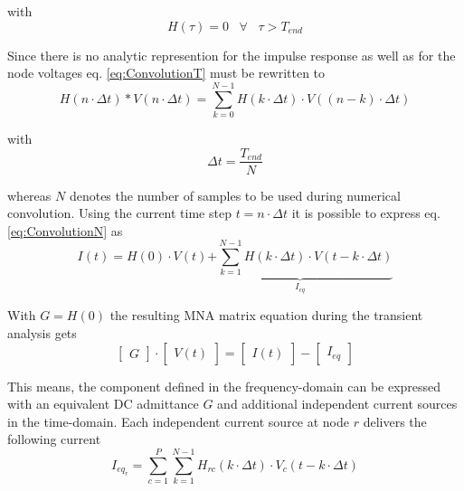 with
\begin{equation}
H\left(\tau\right) = 0 \;\;\; \forall \;\;\; \tau > T_{end}
\end{equation}

Since there is no analytic represention for the impulse response as
well as for the node voltages eq. \eqref{eq:ConvolutionT} must be
rewritten to
\begin{equation}
\label{eq:ConvolutionN}
H\left(n\cdot\Delta t\right)
*
V\left(n\cdot\Delta t\right)
=
\sum^{N-1}_{k=0} H\left(k\cdot\Delta t\right)\cdot V\left(\left(n-k\right)\cdot\Delta t\right)
\end{equation}

with
\begin{equation}
\Delta t = \dfrac{T_{end}}{N}
\end{equation}

whereas $N$ denotes the number of samples to be used during numerical
convolution.  Using the current time step $t = n\cdot\Delta t$ it is
possible to express eq. \eqref{eq:ConvolutionN} as
\begin{equation}
I\left(t\right) =
H\left(0\right)\cdot V\left(t\right) \underbrace{+
\sum^{N-1}_{k=1} H\left(k\cdot\Delta t\right)\cdot V\left(t -k\cdot\Delta t\right)}_{I_{eq}}
\end{equation}

With $G = H\left(0\right)$ the resulting MNA matrix equation during
the transient analysis gets
\begin{equation}
\begin{bmatrix}
G
\end{bmatrix}
\cdot
\begin{bmatrix}
V\left(t\right)
\end{bmatrix}
=
\begin{bmatrix}
I\left(t\right)
\end{bmatrix}
-
\begin{bmatrix}
I_{eq}
\end{bmatrix}
\end{equation}

This means, the component defined in the frequency-domain can be
expressed with an equivalent DC admittance $G$ and additional
independent current sources in the time-domain.  Each independent
current source at node $r$ delivers the following current
\begin{equation}
I_{eq_r} = 
\sum^{P}_{c=1}\sum^{N-1}_{k=1} H_{rc}\left(k\cdot\Delta t\right)\cdot V_c\left(t -k\cdot\Delta t\right)
\end{equation}

